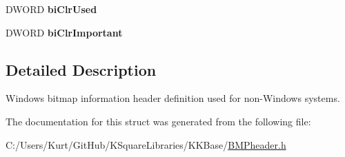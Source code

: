 \begin{DoxyCompactItemize}
\item 
D\+W\+O\+RD {\bfseries bi\+Clr\+Used}\hypertarget{struct_k_k_b_1_1_b_i_t_m_a_p_i_n_f_o_h_e_a_d_e_r_aa1bc166d045517815509f22ce42eccc4}{}\label{struct_k_k_b_1_1_b_i_t_m_a_p_i_n_f_o_h_e_a_d_e_r_aa1bc166d045517815509f22ce42eccc4}

\item 
D\+W\+O\+RD {\bfseries bi\+Clr\+Important}\hypertarget{struct_k_k_b_1_1_b_i_t_m_a_p_i_n_f_o_h_e_a_d_e_r_a4e5d94e1fa8e139db87e5b3a94599370}{}\label{struct_k_k_b_1_1_b_i_t_m_a_p_i_n_f_o_h_e_a_d_e_r_a4e5d94e1fa8e139db87e5b3a94599370}

\end{DoxyCompactItemize}


\subsection{Detailed Description}
Windows bitmap information header definition used for non-\/\+Windows systems. 

The documentation for this struct was generated from the following file\+:\begin{DoxyCompactItemize}
\item 
C\+:/\+Users/\+Kurt/\+Git\+Hub/\+K\+Square\+Libraries/\+K\+K\+Base/\hyperlink{_b_m_pheader_8h}{B\+M\+Pheader.\+h}\end{DoxyCompactItemize}

